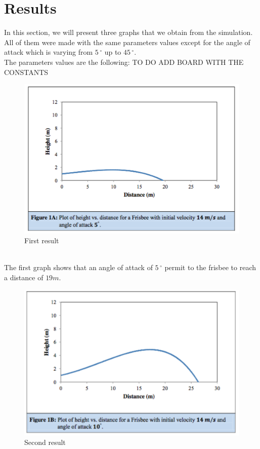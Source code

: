 \documentclass[10pt,a4paper]{report}
\begin{document}
\section{Results}
In this section, we will present three graphs that we obtain from the simulation. All of them were made with the same parameters values except for the angle of attack which is varying from $5\,^{\circ}$ up to $45\,^{\circ} $. 
\\The parameters values are the following:
TO DO ADD BOARD WITH THE CONSTANTS
\begin{figure}[!h]
 \centering
\includegraphics[scale=0.6]{graph1.jpg}
\caption{First result}
\label{First result}
\end{figure}
\\The first graph shows that an angle of attack of $5\,^{\circ}$ permit to the frisbee to reach a distance of $19m$.
\begin{figure}[!h]
\centering
\includegraphics[scale=0.6]{graph2.jpg}
\caption{Second result}
\label{Second result}
\end{figure}
\end{document}
